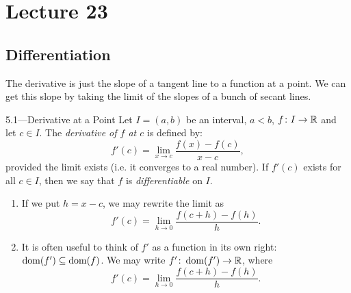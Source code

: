 \documentclass[class=article, crop=false]{standalone}
\begin{document}
  \section{Lecture 23}
  \subsection{Differentiation}
  The derivative is just the slope of a tangent line to a function at a point. We can get this slope by taking the limit of the slopes of a bunch of secant lines.
  \begin{definition}{5.1---Derivative at a Point}
    Let $I = (a, b)$ be an interval, $a < b$, $f\colon I\to \mathbb{R}$ and let $c\in I$. The \emph{derivative of $f$ at $c$} is defined by:
    \[
      f'(c) = \lim_{x\to c} \frac{f(x) - f(c)}{x - c},
    \]
    provided the limit exists (i.e. it converges to a real number). If $f'(c)$ exists for all $c\in I$, then we say that $f$ is \emph{differentiable} on $I$.
  \end{definition}
  \begin{note}{}
    \begin{enumerate}[label=\arabic*)]
      \item If we put $h = x - c$, we may rewrite the limit as
      \[
        f'(c) = \lim_{h\to 0} \frac{f(c + h) - f(h)}{h}.
      \]
      \item It is often useful to think of $f'$ as a function in its own right: $\operatorname{dom}(f')\subseteq\operatorname{dom}(f)$. We may write $f'\colon \operatorname{dom}(f')\to \mathbb{R}$, where
      \[
        f'(c) = \lim_{h\to 0} \frac{f(c + h) - f(h)}{h}.
      \]
    \end{enumerate}
  \end{note}
\end{document}
